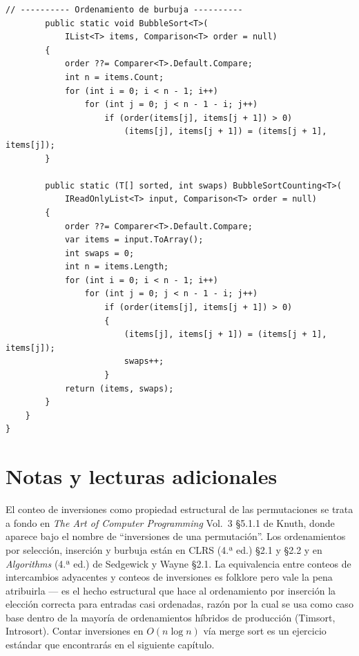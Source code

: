 \documentclass[11pt,a4paper]{article}
\begin{document}
\begin{lstlisting}[caption={\texttt{Basic.cs} --- todos los algoritmos}]
        // ---------- Ordenamiento de burbuja ----------
        public static void BubbleSort<T>(
            IList<T> items, Comparison<T> order = null)
        {
            order ??= Comparer<T>.Default.Compare;
            int n = items.Count;
            for (int i = 0; i < n - 1; i++)
                for (int j = 0; j < n - 1 - i; j++)
                    if (order(items[j], items[j + 1]) > 0)
                        (items[j], items[j + 1]) = (items[j + 1], items[j]);
        }

        public static (T[] sorted, int swaps) BubbleSortCounting<T>(
            IReadOnlyList<T> input, Comparison<T> order = null)
        {
            order ??= Comparer<T>.Default.Compare;
            var items = input.ToArray();
            int swaps = 0;
            int n = items.Length;
            for (int i = 0; i < n - 1; i++)
                for (int j = 0; j < n - 1 - i; j++)
                    if (order(items[j], items[j + 1]) > 0)
                    {
                        (items[j], items[j + 1]) = (items[j + 1], items[j]);
                        swaps++;
                    }
            return (items, swaps);
        }
    }
}
\end{lstlisting}

\section{Notas y lecturas adicionales}

El conteo de inversiones como propiedad estructural de las permutaciones se trata a fondo en \emph{The Art of Computer Programming} Vol.~3 \S 5.1.1 de Knuth, donde aparece bajo el nombre de ``inversiones de una permutación''. Los ordenamientos por selección, inserción y burbuja están en CLRS (4.ª ed.) \S 2.1 y \S 2.2 y en \emph{Algorithms} (4.ª ed.) de Sedgewick y Wayne \S 2.1. La equivalencia entre conteos de intercambios adyacentes y conteos de inversiones es folklore pero vale la pena atribuirla --- es el hecho estructural que hace al ordenamiento por inserción la elección correcta para entradas casi ordenadas, razón por la cual se usa como caso base dentro de la mayoría de ordenamientos híbridos de producción (Timsort, Introsort). Contar inversiones en $O(n \log n)$ vía merge sort es un ejercicio estándar que encontrarás en el siguiente capítulo.
\end{document}
